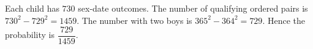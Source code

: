 Each child has $730$ sex-date outcomes. The number of qualifying ordered pairs is $730^2-729^2=1459$. The number with two boys is $365^2-364^2=729$. Hence the probability is $\boxed{\dfrac{729}{1459}}$.
